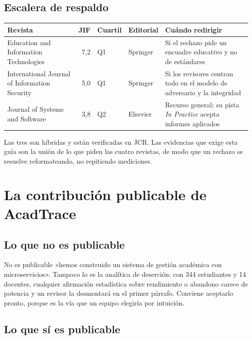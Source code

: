 \documentclass[11pt,a4paper]{article}
\begin{document}
\subsection{Escalera de respaldo}

\begin{center}
	\small
	\begin{tabular}{@{}p{5.4cm}rp{1.5cm}p{2.0cm}p{4.3cm}@{}}
		\toprule
		\textbf{Revista} & \textbf{JIF} & \textbf{Cuartil} & \textbf{Editorial} & \textbf{Cuándo redirigir} \\
		\midrule
		Education and Information Technologies & 7,2 & Q1 & Springer & Si el rechazo pide un encuadre educativo y no de estándares \\
		\addlinespace
		International Journal of Information Security & 5,0 & Q1 & Springer & Si los revisores centran todo en el modelo de adversario y la integridad \\
		\addlinespace
		Journal of Systems and Software & 3,8 & Q2 & Elsevier & Recurso general; su pista \emph{In Practice} acepta informes aplicados \\
		\bottomrule
	\end{tabular}
\end{center}

Las tres son híbridas y están verificadas en JCR. Las evidencias que exige esta guía son la unión de lo que piden las cuatro revistas, de modo que un rechazo se resuelve reformateando, no repitiendo mediciones.

\section{La contribución publicable de AcadTrace}

\subsection{Lo que no es publicable}

No es publicable «hemos construido un sistema de gestión académica con microservicios». Tampoco lo es la analítica de deserción: con 344 estudiantes y 14 docentes, cualquier afirmación estadística sobre rendimiento o abandono carece de potencia y un revisor la desmontará en el primer párrafo. Conviene aceptarlo pronto, porque es la vía que un equipo elegiría por intuición.

\subsection{Lo que sí es publicable}
\end{document}
